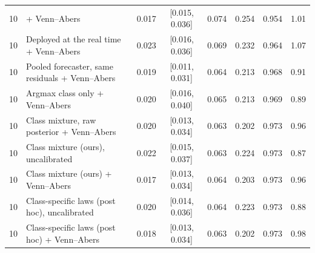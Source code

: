 \begin{table}[!htbp]
{\begin{tabular}{rlcccccc}
10 & \quad + Venn--Abers & 0.017 & [0.015, 0.036] & 0.074 & 0.254 & 0.954 & 1.01 \\
10 & Deployed at the real time + Venn--Abers & 0.023 & [0.016, 0.036] & 0.069 & 0.232 & 0.964 & 1.07 \\
10 & Pooled forecaster, same residuals + Venn--Abers & 0.019 & [0.011, 0.031] & 0.064 & 0.213 & 0.968 & 0.91 \\
10 & Argmax class only + Venn--Abers & 0.020 & [0.016, 0.040] & 0.065 & 0.213 & 0.969 & 0.89 \\
10 & Class mixture, raw posterior + Venn--Abers & 0.020 & [0.013, 0.034] & 0.063 & 0.202 & 0.973 & 0.96 \\
10 & Class mixture (ours), uncalibrated & 0.022 & [0.015, 0.037] & 0.063 & 0.224 & 0.973 & 0.87 \\
10 & Class mixture (ours) + Venn--Abers & 0.017 & [0.013, 0.034] & 0.064 & 0.203 & 0.973 & 0.96 \\
10 & Class-specific laws (post hoc), uncalibrated & 0.020 & [0.014, 0.036] & 0.064 & 0.223 & 0.973 & 0.88 \\
10 & Class-specific laws (post hoc) + Venn--Abers & 0.018 & [0.013, 0.034] & 0.063 & 0.202 & 0.973 & 0.98 \\
\bottomrule
\end{tabular}}
\end{table}
